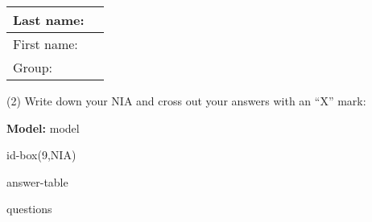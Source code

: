 \documentclass[a4paper,11pt]{article}
\begin{document}
\begin{center}
\large

\begin{tabular}{|l|p{12cm}|}
\hline
Last name:   &  \\
\hline
First name: &    \\
\hline
Group:   &  \\
\hline
\end{tabular}
\end{center}

\vspace{0.2cm}

\begin{center}
(2) Write down your NIA and cross out your answers with an ``X'' mark:
\end{center}

\begin{center}
\large
\textbf{Model:} {{model}}
\end{center}

{{id-box(9,NIA)}}

{{answer-table}}

\clearpage

{{questions}}
\end{document}
